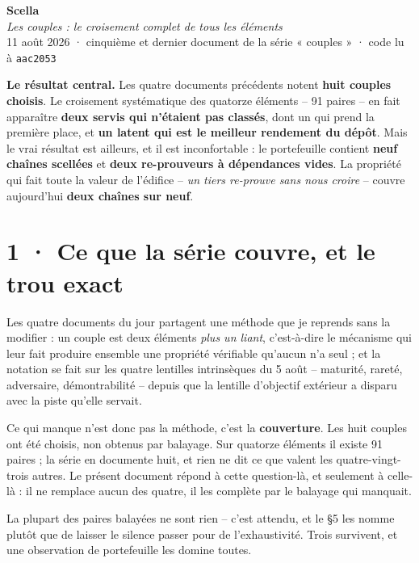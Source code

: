 \documentclass[10pt]{article}
\newcommand{\code}[1]{\texttt{\small #1}}
\begin{document}
\begin{center}
{\Huge\bfseries\color{navy} Scella}\\[4pt]
{\large\color{grey}\itshape Les couples : le croisement complet de tous les éléments}\\[4pt]
{\small\color{grey} 11 août 2026 \; · \; cinquième et dernier document de la série « couples » \; · \; code lu à \code{aac2053}}
\end{center}
\vspace{2pt}

\begin{these}
\textbf{Le résultat central.} Les quatre documents précédents notent \textbf{huit couples choisis}. Le
croisement systématique des quatorze éléments -- 91 paires -- en fait apparaître \textbf{deux servis qui
n'étaient pas classés}, dont un qui prend la première place, et \textbf{un latent qui est le meilleur
rendement du dépôt}. Mais le vrai résultat est ailleurs, et il est inconfortable : le portefeuille
contient \textbf{neuf chaînes scellées} et \textbf{deux re-prouveurs à dépendances vides}. La propriété
qui fait toute la valeur de l'édifice -- \emph{un tiers re-prouve sans nous croire} -- couvre
aujourd'hui \textbf{deux chaînes sur neuf}.
\end{these}

\section{1 · Ce que la série couvre, et le trou exact}

Les quatre documents du jour partagent une méthode que je reprends sans la modifier : un couple est deux
éléments \emph{plus un liant}, c'est-à-dire le mécanisme qui leur fait produire ensemble une propriété
vérifiable qu'aucun n'a seul ; et la notation se fait sur les quatre lentilles intrinsèques du 5 août --
maturité, rareté, adversaire, démontrabilité -- depuis que la lentille d'objectif extérieur a disparu
avec la piste qu'elle servait.

Ce qui manque n'est donc pas la méthode, c'est la \textbf{couverture}. Les huit couples ont été choisis,
non obtenus par balayage. Sur quatorze éléments il existe 91 paires ; la série en documente huit, et rien
ne dit ce que valent les quatre-vingt-trois autres. Le présent document répond à cette question-là, et
seulement à celle-là : il ne remplace aucun des quatre, il les complète par le balayage qui manquait.

La plupart des paires balayées ne sont rien -- c'est attendu, et le §5 les nomme plutôt que de laisser
le silence passer pour de l'exhaustivité. Trois survivent, et une observation de portefeuille les domine
toutes.
\end{document}
